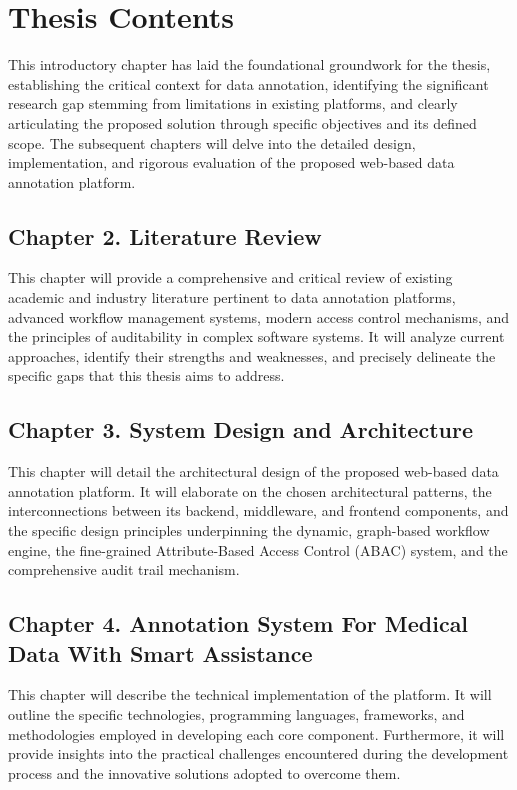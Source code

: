 \label{chap1:sec4-thesis-content}

\section{Thesis Contents}
This introductory chapter has laid the foundational groundwork for the thesis, establishing the critical context for data annotation, identifying the significant research gap stemming from limitations in existing platforms, and clearly articulating the proposed solution through specific objectives and its defined scope. The subsequent chapters will delve into the detailed design, implementation, and rigorous evaluation of the proposed web-based data annotation platform.

\subsection*{Chapter 2. Literature Review}
  This chapter will provide a comprehensive and critical review of existing academic and industry literature pertinent to data annotation platforms, advanced workflow management systems, modern access control mechanisms, and the principles of auditability in complex software systems. It will analyze current approaches, identify their strengths and weaknesses, and precisely delineate the specific gaps that this thesis aims to address.

\subsection*{Chapter 3. System Design and Architecture}
 This chapter will detail the architectural design of the proposed web-based data annotation platform. It will elaborate on the chosen architectural patterns, the interconnections between its backend, middleware, and frontend components, and the specific design principles underpinning the dynamic, graph-based workflow engine, the fine-grained Attribute-Based Access Control (ABAC) system, and the comprehensive audit trail mechanism.

\subsection*{Chapter 4. Annotation System For Medical Data With Smart Assistance}
 This chapter will describe the technical implementation of the platform. It will outline the specific technologies, programming languages, frameworks, and methodologies employed in developing each core component. Furthermore, it will provide insights into the practical challenges encountered during the development process and the innovative solutions adopted to overcome them.

